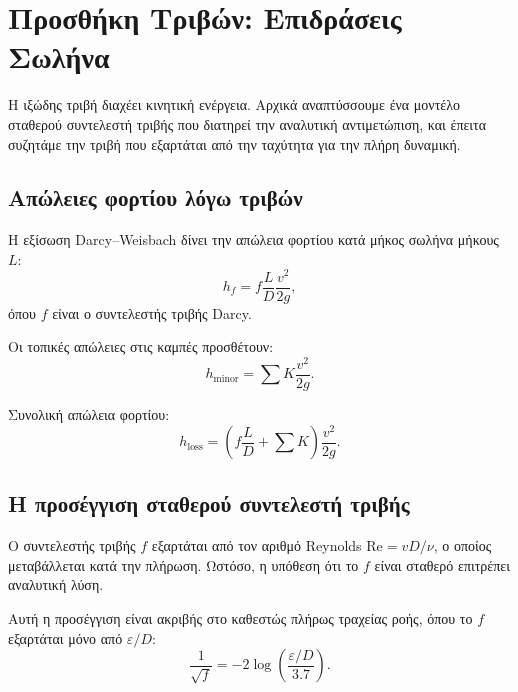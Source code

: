 \documentclass[11pt]{article}
\begin{document}
\section{Προσθήκη Τριβών: Επιδράσεις Σωλήνα}
\label{sec:friction}

Η ιξώδης τριβή διαχέει κινητική ενέργεια. Αρχικά αναπτύσσουμε ένα μοντέλο σταθερού συντελεστή τριβής που διατηρεί την αναλυτική αντιμετώπιση, και έπειτα συζητάμε την τριβή που εξαρτάται από την ταχύτητα για την πλήρη δυναμική.

\subsection{Απώλειες φορτίου λόγω τριβών}

Η εξίσωση Darcy--Weisbach δίνει την απώλεια φορτίου κατά μήκος σωλήνα μήκους $L$:
\begin{equation}
  h_f = f \frac{L}{D} \frac{v^2}{2g},
  \label{eq:darcy-weisbach}
\end{equation}
όπου $f$ είναι ο συντελεστής τριβής Darcy.

Οι τοπικές απώλειες στις καμπές προσθέτουν:
\begin{equation}
  h_{\text{minor}} = \sum K \frac{v^2}{2g}.
  \label{eq:minor-loss}
\end{equation}

Συνολική απώλεια φορτίου:
\begin{equation}
  h_{\text{loss}} = \left(f\frac{L}{D} + \sum K\right) \frac{v^2}{2g}.
  \label{eq:total-loss}
\end{equation}

\subsection{Η προσέγγιση σταθερού συντελεστή τριβής}

Ο συντελεστής τριβής $f$ εξαρτάται από τον αριθμό Reynolds $\text{Re} = vD/\nu$, ο οποίος μεταβάλλεται κατά την πλήρωση. Ωστόσο, η υπόθεση ότι το $f$ είναι σταθερό επιτρέπει αναλυτική λύση.

Αυτή η προσέγγιση είναι ακριβής στο καθεστώς πλήρως τραχείας ροής, όπου το $f$ εξαρτάται μόνο από $\varepsilon/D$:
\begin{equation}
  \frac{1}{\sqrt{f}} = -2\log\left(\frac{\varepsilon/D}{3.7}\right).
  \label{eq:fully-rough}
\end{equation}
\end{document}
